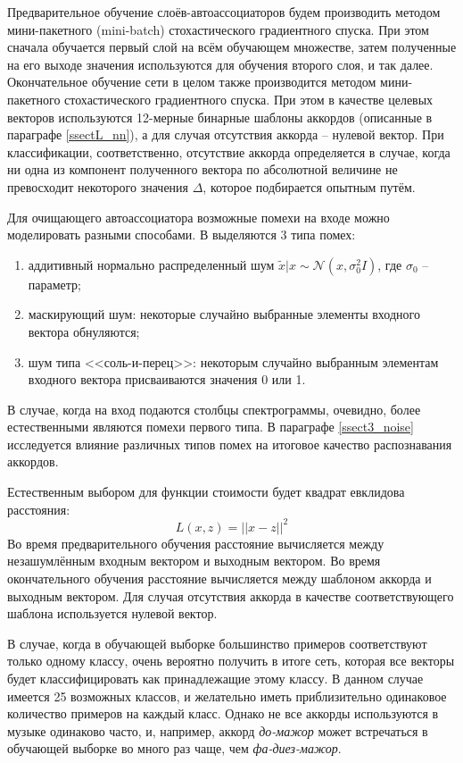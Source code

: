 Предварительное обучение слоёв-автоассоциаторов будем производить методом
мини-пакетного (mini-batch) стохастического градиентного спуска. При этом
сначала обучается первый слой на всём обучающем множестве, затем полученные на
его выходе значения используются для обучения второго слоя, и так далее.
Окончательное обучение сети в целом также производится методом мини-пакетного
стохастического градиентного спуска. При этом в качестве целевых векторов
используются 12-мерные бинарные шаблоны аккордов (описанные в параграфе
\ref{ssectL_nn}), а для случая отсутствия аккорда -- нулевой вектор.
При классификации, соответственно, отсутствие аккорда определяется в случае,
когда ни одна из компонент полученного вектора по абсолютной величине не
превосходит некоторого значения $\Delta$, которое подбирается опытным путём.

Для очищающего автоассоциатора возможные помехи на входе можно моделировать
разными способами. В \cite{Vincent2010} выделяются 3 типа помех:
\begin{enumerate}
  \item аддитивный нормально распределенный шум $\tilde{x}|x \sim
  \mathcal{N}(x, \sigma_0^2 I)$, где $\sigma_0$ -- параметр;
  \item маскирующий шум: некоторые случайно выбранные элементы входного вектора
  обнуляются;
  \item шум типа <<соль-и-перец>>: некоторым случайно выбранным элементам
  входного вектора присваиваются значения 0 или 1.
\end{enumerate}
В случае, когда на вход подаются столбцы спектрограммы, очевидно, более
естественными являются помехи первого типа. В параграфе \ref{ssect3_noise}
исследуется влияние различных типов помех на итоговое качество распознавания
аккордов.

Естественным выбором для функции стоимости будет квадрат евклидова расстояния:
$$L(x,z) = ||x-z||^2$$
Во время предварительного обучения расстояние вычисляется между незашумлённым
входным вектором и выходным вектором. Во время окончательного обучения
расстояние вычисляется между шаблоном аккорда и выходным вектором. Для случая
отсутствия аккорда в качестве соответствующего шаблона используется нулевой
вектор.

В случае, когда в обучающей выборке большинство примеров соответствуют только
одному классу, очень вероятно получить в итоге сеть, которая все векторы будет
классифицировать как принадлежащие этому классу. В данном случае имеется 25
возможных классов, и желательно иметь приблизительно одинаковое количество
примеров на каждый класс. Однако не все аккорды используются в музыке одинаково
часто, и, например, аккорд \emph{до-мажор} может встречаться в обучающей выборке
во много раз чаще, чем \emph{фа-диез-мажор}.

